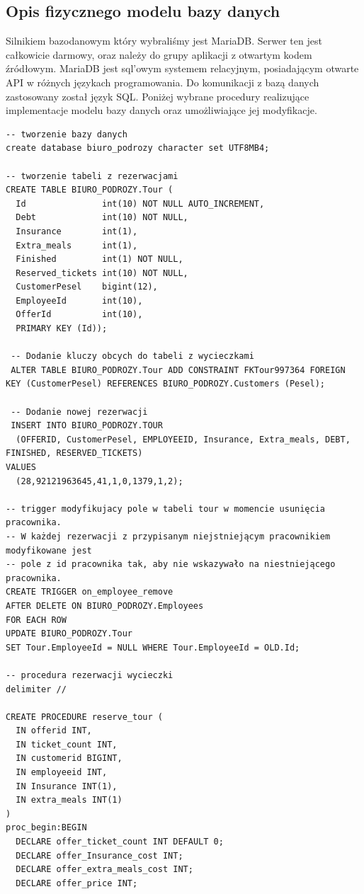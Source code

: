 \documentclass[polish,polish,a4paper]{article}
\begin{document}
\subsection{Opis fizycznego modelu bazy danych}
Silnikiem bazodanowym który wybraliśmy jest MariaDB. Serwer ten jest całkowicie darmowy, oraz należy do grupy aplikacji  z otwartym kodem źródłowym.
MariaDB jest sql'owym systemem relacyjnym, posiadającym otwarte API w różnych językach programowania.
Do komunikacji z bazą danych zastosowany został język SQL. Poniżej wybrane procedury realizujące implementacje modelu bazy danych oraz umożliwiające jej modyfikacje.
\begin{lstlisting}
-- tworzenie bazy danych
create database biuro_podrozy character set UTF8MB4;

-- tworzenie tabeli z rezerwacjami 
CREATE TABLE BIURO_PODROZY.Tour (
  Id               int(10) NOT NULL AUTO_INCREMENT, 
  Debt             int(10) NOT NULL, 
  Insurance        int(1),
  Extra_meals      int(1), 
  Finished         int(1) NOT NULL, 
  Reserved_tickets int(10) NOT NULL, 
  CustomerPesel    bigint(12), 
  EmployeeId       int(10), 
  OfferId          int(10), 
  PRIMARY KEY (Id));

 -- Dodanie kluczy obcych do tabeli z wycieczkami 
 ALTER TABLE BIURO_PODROZY.Tour ADD CONSTRAINT FKTour997364 FOREIGN KEY (CustomerPesel) REFERENCES BIURO_PODROZY.Customers (Pesel);

 -- Dodanie nowej rezerwacji
 INSERT INTO BIURO_PODROZY.TOUR 
  (OFFERID, CustomerPesel, EMPLOYEEID, Insurance, Extra_meals, DEBT, FINISHED, RESERVED_TICKETS) 
VALUES 
  (28,92121963645,41,1,0,1379,1,2);
 
-- trigger modyfikujacy pole w tabeli tour w momencie usunięcia pracownika.
-- W każdej rezerwacji z przypisanym niejstniejącym pracownikiem modyfikowane jest
-- pole z id pracownika tak, aby nie wskazywało na niestniejącego pracownika.  
CREATE TRIGGER on_employee_remove
AFTER DELETE ON BIURO_PODROZY.Employees 
FOR EACH ROW 
UPDATE BIURO_PODROZY.Tour
SET Tour.EmployeeId = NULL WHERE Tour.EmployeeId = OLD.Id;

-- procedura rezerwacji wycieczki
delimiter //

CREATE PROCEDURE reserve_tour (
  IN offerid INT,
  IN ticket_count INT,
  IN customerid BIGINT,
  IN employeeid INT,
  IN Insurance INT(1),
  IN extra_meals INT(1)
)
proc_begin:BEGIN
  DECLARE offer_ticket_count INT DEFAULT 0;
  DECLARE offer_Insurance_cost INT;
  DECLARE offer_extra_meals_cost INT;
  DECLARE offer_price INT;
  

\end{lstlisting}
\end{document}
